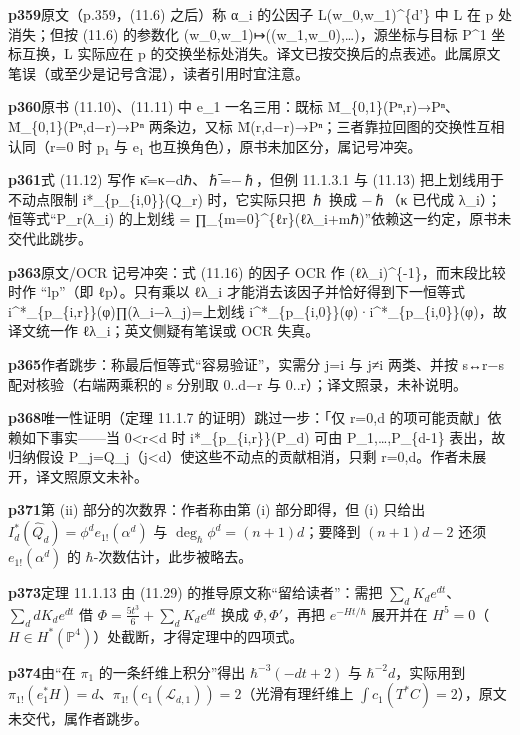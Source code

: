 \noindent\textbf{\footnotesize p359}\quad 原文（p.359，(11.6) 之后）称 α\_i 的公因子 L(w\_0,w\_1)\^{}\{d'\} 中 L 在 p 处消失；但按 (11.6) 的参数化 (w\_0,w\_1)↦((w\_1,w\_0),…)，源坐标与目标 P\^{}1 坐标互换，L 实际应在 p 的交换坐标处消失。译文已按交换后的点表述。此属原文笔误（或至少是记号含混），读者引用时宜注意。

\noindent\textbf{\footnotesize p360}\quad 原书 (11.10)、(11.11) 中 e\_1 一名三用：既标 M̄\_\{0,1\}(Pⁿ,r)→Pⁿ、M̄\_\{0,1\}(Pⁿ,d−r)→Pⁿ 两条边，又标 M̄(r,d−r)→Pⁿ；三者靠拉回图的交换性互相认同（r=0 时 p₁ 与 e₁ 也互换角色），原书未加区分，属记号冲突。

\noindent\textbf{\footnotesize p361}\quad 式 (11.12) 写作 κ̄=κ−dℏ、ℏ̄=−ℏ，但例 11.1.3.1 与 (11.13) 把上划线用于不动点限制 i*\_\{p\_\{i,0\}\}(Q\_r) 时，它实际只把 ℏ 换成 −ℏ（κ 已代成 λ\_i）；恒等式“P\_r(λ\_i) 的上划线 = ∏\_\{m=0\}\^{}\{ℓr\}(ℓλ\_i+mℏ)”依赖这一约定，原书未交代此跳步。

\noindent\textbf{\footnotesize p363}\quad 原文/OCR 记号冲突：式 (11.16) 的因子 OCR 作 (ℓλ\_i)\^{}\{-1\}，而末段比较时作 “lp”（即 ℓp）。只有乘以 ℓλ\_i 才能消去该因子并恰好得到下一恒等式 i\^{}*\_\{p\_\{i,r\}\}(φ)∏(λ\_i−λ\_j)=上划线 i\^{}*\_\{p\_\{i,0\}\}(φ)·i\^{}*\_\{p\_\{i,0\}\}(φ)，故译文统一作 ℓλ\_i；英文侧疑有笔误或 OCR 失真。

\noindent\textbf{\footnotesize p365}\quad 作者跳步：称最后恒等式“容易验证”，实需分 j=i 与 j≠i 两类、并按 s↔r−s 配对核验（右端两乘积的 s 分别取 0..d−r 与 0..r）；译文照录，未补说明。

\noindent\textbf{\footnotesize p368}\quad 唯一性证明（定理 11.1.7 的证明）跳过一步：「仅 r=0,d 的项可能贡献」依赖如下事实——当 0<r<d 时 i*\_\{p\_\{i,r\}\}(P\_d) 可由 P\_1,…,P\_\{d-1\} 表出，故归纳假设 P\_j=Q\_j（j<d）使这些不动点的贡献相消，只剩 r=0,d。作者未展开，译文照原文未补。

\noindent\textbf{\footnotesize p371}\quad 第 (ii) 部分的次数界：作者称由第 (i) 部分即得，但 (i) 只给出 $I_d^*(\widehat Q_d)=\phi^d e_{1!}(\alpha^d)$ 与 $\deg_\hbar\phi^d=(n+1)d$；要降到 $(n+1)d-2$ 还须 $e_{1!}(\alpha^d)$ 的 $\hbar$-次数估计，此步被略去。

\noindent\textbf{\footnotesize p373}\quad 定理 11.1.13 由 (11.29) 的推导原文称“留给读者”：需把 $\sum_d K_de^{dt}$、$\sum_d dK_de^{dt}$ 借 $\Phi=\frac{5t^3}{6}+\sum_d K_de^{dt}$ 换成 $\Phi,\Phi'$，再把 $e^{-Ht/\hbar}$ 展开并在 $H^5=0$（$H\in H^*(\mathbb P^4)$）处截断，才得定理中的四项式。

\noindent\textbf{\footnotesize p374}\quad 由“在 $\pi_1$ 的一条纤维上积分”得出 $\hbar^{-3}(-dt+2)$ 与 $\hbar^{-2}d$，实际用到 $\pi_{1!}(e_1^*H)=d$、$\pi_{1!}(c_1(\mathcal L_{d,1}))=2$（光滑有理纤维上 $\int c_1(T^*C)=2$），原文未交代，属作者跳步。

